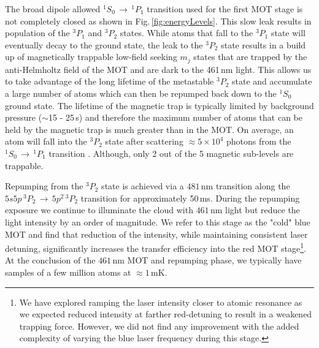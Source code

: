 The broad dipole allowed $^1S_0\,\rightarrow\,^1P_1$ transition used for the first MOT stage is not completely closed as shown in Fig.\,\ref{fig:energyLevels}.
This slow leak results in population of the $^3P_1$ and $^3P_2$ states.
While atoms that fall to the $^3P_1$ state will eventually decay to the ground state, the leak to the $^3P_2$ state results in a build up of magnetically trappable low-field seeking $m_j$ states that are trapped by the anti-Helmholtz field of the MOT and are dark to the 461\,nm light.
This allows us to take advantage of the long lifetime of the metastable $^3P_2$ state and accumulate a large number of atoms which can then be repumped back down to the $^1S_0$ ground state.
The lifetime of the magnetic trap is typically limited by background pressure ($\sim$15 - 25\,s) and therefore the maximum number of atoms that can be held by the magnetic trap is much greater than in the MOT.
On average, an atom will fall into the $^3P_2$ state after scattering $\approx5\times10^4$ photons from the $^1S_0\,\rightarrow\,^1P_1$ transition \cite{Cooper2018}.
Although, only 2 out of the 5 magnetic sub-levels are trappable.

Repumping from the $^3P_2$ state is achieved via a $481\,$nm transition along the $5s5p\,^3P_2\,\rightarrow\,5p^2\,^3P_2$ transition for approximately 50\,ms.
During the repumping exposure we continue to illuminate the cloud with $461\,$nm light but reduce the light intensity by an order of magnitude.
We refer to this stage as the "cold" blue MOT and find that reduction of the intensity, while maintaining consistent laser detuning, significantly increases the transfer efficiency into the red MOT stage\footnote{We have explored ramping the laser intensity closer to atomic resonance as we expected reduced intensity at farther red-detuning to result in a weakened trapping force.
However, we did not find any improvement with the added complexity of varying the blue laser frequency during this stage.}.
At the conclusion of the $461\,$nm MOT and repumping phase, we typically have samples of a few million atoms at $\approx1\,$mK.


